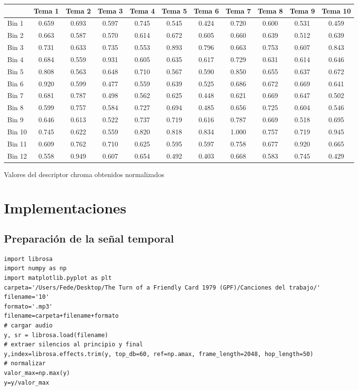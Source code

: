 \documentclass[]{article}
\makeatletter
\newcommand{\tabla}[4]{
\begin{tablehere}
\begin{center}
\begin{tabular}{#1}
#2
\end{tabular}
\caption{#3}
\label{#4}
\end{center}
\end{tablehere}
}
\newenvironment{tablehere}    %
  {\def\@captype{table}}    %

  {}              %
\makeatother
\begin{document}
\tabla
{|l|c|c|c|c|c|c|c|c|c|c|}
{
\hline
&Tema 1 & Tema 2 & Tema 3 & Tema 4 & Tema 5 & Tema 6 & Tema 7 & Tema 8 & Tema 9 & Tema 10 \\
\hline
Bin 1  & 0.659 & 0.693 & 0.597 & 0.745 & 0.545 & 0.424 & 0.720 & 0.600 & 0.531 & 0.459 \\
\hline
Bin 2  & 0.663 & 0.587 & 0.570 & 0.614 & 0.672 & 0.605 & 0.660 & 0.639 & 0.512 & 0.639 \\
\hline
Bin 3  & 0.731 & 0.633 & 0.735 & 0.553 & 0.893 & 0.796 & 0.663 & 0.753 & 0.607 & 0.843 \\
\hline
Bin 4  & 0.684 & 0.559 & 0.931 & 0.605 & 0.635 & 0.617 & 0.729 & 0.631 & 0.614 & 0.646 \\
\hline
Bin 5  & 0.808 & 0.563 & 0.648 & 0.710 & 0.567 & 0.590 & 0.850 & 0.655 & 0.637 & 0.672 \\
\hline
Bin 6  & 0.920 & 0.599 & 0.477 & 0.559 & 0.639 & 0.525 & 0.686 & 0.672 & 0.669 & 0.641 \\
\hline
Bin 7  & 0.681 & 0.787 & 0.498 & 0.562 & 0.625 & 0.448 & 0.621 & 0.669 & 0.647 & 0.502 \\
\hline
Bin 8  & 0.599 & 0.757 & 0.584 & 0.727 & 0.694 & 0.485 & 0.656 & 0.725 & 0.604 & 0.546 \\
\hline
Bin 9  & 0.646 & 0.613 & 0.522 & 0.737 & 0.719 & 0.616 & 0.787 & 0.669 & 0.518 & 0.695 \\
\hline
Bin 10 & 0.745 & 0.622 & 0.559 & 0.820 & 0.818 & 0.834 & 1.000 & 0.757 & 0.719 & 0.945 \\
\hline
Bin 11 & 0.609 & 0.762 & 0.710 & 0.625 & 0.595 & 0.597 & 0.758 & 0.677 & 0.920 & 0.665 \\
\hline
Bin 12 & 0.558 & 0.949 & 0.607 & 0.654 & 0.492 & 0.403 & 0.668 & 0.583 & 0.745 & 0.429 \\
\hline
}
{Valores del descriptor chroma obtenidos normalizados}
{tab: chroma norm}

\section{Implementaciones}
\subsection{Preparación de la señal temporal}
\label{Prep}
\begin{verbatim}
import librosa
import numpy as np
import matplotlib.pyplot as plt
carpeta='/Users/Fede/Desktop/The Turn of a Friendly Card 1979 (GPF)/Canciones del trabajo/'
filename='10'
formato='.mp3'
filename=carpeta+filename+formato
# cargar audio
y, sr = librosa.load(filename)
# extraer silencios al principio y final
y,index=librosa.effects.trim(y, top_db=60, ref=np.amax, frame_length=2048, hop_length=50)
# normalizar
valor_max=np.max(y)
y=y/valor_max
\end{verbatim}
\end{document}

